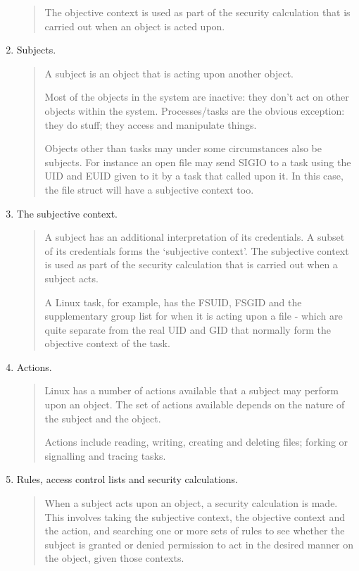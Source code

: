 \documentclass[a4paper,8pt,english]{sphinxmanual}
\begin{document}
\begin{enumerate}
\begin{quote}
The objective context is used as part of the security calculation that is
carried out when an object is acted upon.
\end{quote}

\item {} 
Subjects.
\begin{quote}

A subject is an object that is acting upon another object.

Most of the objects in the system are inactive: they don't act on other
objects within the system.  Processes/tasks are the obvious exception:
they do stuff; they access and manipulate things.

Objects other than tasks may under some circumstances also be subjects.
For instance an open file may send SIGIO to a task using the UID and EUID
given to it by a task that called  upon it.  In this case,
the file struct will have a subjective context too.
\end{quote}

\item {} 
The subjective context.
\begin{quote}

A subject has an additional interpretation of its credentials.  A subset
of its credentials forms the `subjective context'.  The subjective context
is used as part of the security calculation that is carried out when a
subject acts.

A Linux task, for example, has the FSUID, FSGID and the supplementary
group list for when it is acting upon a file - which are quite separate
from the real UID and GID that normally form the objective context of the
task.
\end{quote}

\item {} 
Actions.
\begin{quote}

Linux has a number of actions available that a subject may perform upon an
object.  The set of actions available depends on the nature of the subject
and the object.

Actions include reading, writing, creating and deleting files; forking or
signalling and tracing tasks.
\end{quote}

\item {} 
Rules, access control lists and security calculations.
\begin{quote}

When a subject acts upon an object, a security calculation is made.  This
involves taking the subjective context, the objective context and the
action, and searching one or more sets of rules to see whether the subject
is granted or denied permission to act in the desired manner on the
object, given those contexts.


\end{quote}
\end{enumerate}
\end{document}
